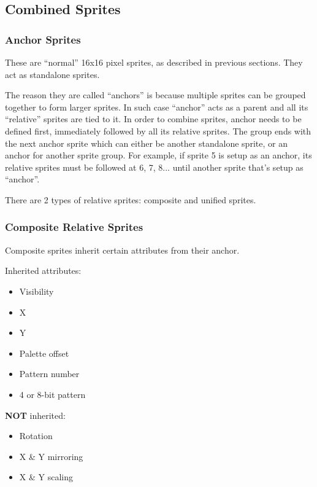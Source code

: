\pagebreak
\subsection{Combined Sprites}

\subsubsection{Anchor Sprites}

These are ``normal'' 16x16 pixel sprites, as described in previous sections. They act as standalone sprites.

The reason they are called ``anchors'' is because multiple sprites can be grouped together to form larger sprites. In such case ``anchor'' acts as a parent and all its ``relative'' sprites are tied to it. In order to combine sprites, anchor needs to be defined first, immediately followed by all its relative sprites. The group ends with the next anchor sprite which can either be another standalone sprite, or an anchor for another sprite group. For example, if sprite 5 is setup as an anchor, its relative sprites must be followed at 6, 7, 8... until another sprite that's setup as ``anchor''.

There are 2 types of relative sprites: composite and unified sprites.

\subsubsection{Composite Relative Sprites}

Composite sprites inherit certain attributes from their anchor.

\begin{multicols}{2}
	 Inherited attributes:

	\begin{itemize}[topsep=1pt,itemsep=1pt]
		\item Visibility
		\item X
		\item Y
		\item Palette offset
		\item Pattern number
		\item 4 or 8-bit pattern 
	\end{itemize}

	\columnbreak

	\textbf{NOT} inherited:

	\begin{itemize}[topsep=1pt,itemsep=1pt]
		\item Rotation
		\item X \& Y mirroring
		\item X \& Y scaling
	\end{itemize}

\end{multicols}

